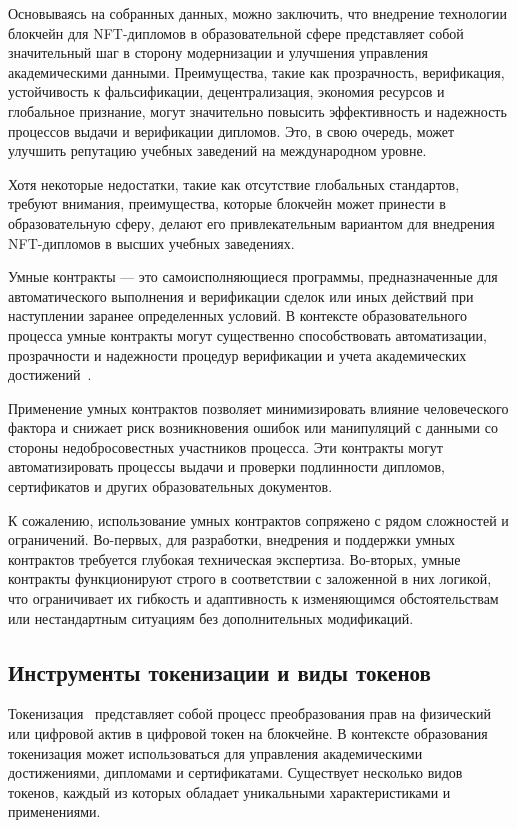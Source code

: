 Основываясь на собранных данных, можно заключить, что внедрение технологии блокчейн для NFT-дипломов в образовательной сфере представляет собой значительный шаг в сторону модернизации и улучшения управления академическими данными. Преимущества, такие как прозрачность, верификация, устойчивость к фальсификации, децентрализация, экономия ресурсов и глобальное признание, могут значительно повысить эффективность и надежность процессов выдачи и верификации дипломов. Это, в свою очередь, может улучшить репутацию учебных заведений на международном уровне.

Хотя некоторые недостатки, такие как отсутствие глобальных стандартов, требуют внимания, преимущества, которые блокчейн может принести в образовательную сферу, делают его привлекательным вариантом для внедрения NFT-дипломов в высших учебных заведениях.

Умные контракты --- это самоисполняющиеся программы, предназначенные для автоматического выполнения и верификации сделок или иных действий при наступлении заранее определенных условий. В контексте образовательного процесса умные контракты могут существенно способствовать автоматизации, прозрачности и надежности процедур верификации и учета академических достижений~\cite{bib:smart_contract}.

Применение умных контрактов позволяет минимизировать влияние человеческого фактора и снижает риск возникновения ошибок или манипуляций с данными со стороны недобросовестных участников процесса. Эти контракты могут автоматизировать процессы выдачи и проверки подлинности дипломов, сертификатов и других образовательных документов.

К сожалению, использование умных контрактов сопряжено с рядом сложностей и ограничений. Во-первых, для разработки, внедрения и поддержки умных контрактов требуется глубокая техническая экспертиза. Во-вторых, умные контракты функционируют строго в соответствии с заложенной в них логикой, что ограничивает их гибкость и адаптивность к изменяющимся обстоятельствам или нестандартным ситуациям без дополнительных модификаций.

\subsection{Инструменты токенизации и виды токенов}

Токенизация~\cite{bib:tokenizer} представляет собой процесс преобразования прав на физический или цифровой актив в цифровой токен на блокчейне. В контексте образования токенизация может использоваться для управления академическими достижениями, дипломами и сертификатами. Существует несколько видов токенов, каждый из которых обладает уникальными характеристиками и применениями.

